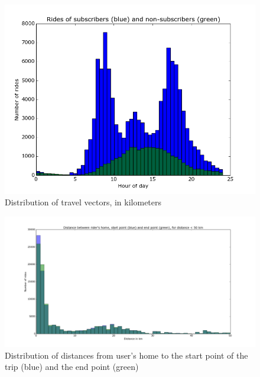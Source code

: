 \documentclass{article}
\begin{document}
\begin{figure}
	\centering
	\includegraphics[width=\textwidth]{../time_of_day_sub_not_sub.png}
	\caption{Distribution of travel vectors, in kilometers}
	\label{fig:sns}
\end{figure}



\begin{figure}
	\centering
	\includegraphics[width=\textwidth]{../start_end_home.png}
	\caption{Distribution of distances from user's home to the start point of the trip (blue) and the end point (green)}
	\label{fig:startendhome}
\end{figure}
\end{document}
